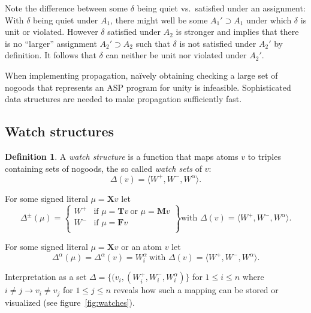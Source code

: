 \documentclass{vutinfth} %
\theoremstyle{example}
\theoremstyle{definition}
\newtheorem{definition}{Definition}[section]
\theoremstyle{theorem}
\theoremstyle{lemma}
\theoremstyle{corollary}
\newcommand{\ass}{A}
\newcommand{\bT}{\mathbf{T}}
\newcommand{\bM}{\mathbf{M}}
\newcommand{\bF}{\mathbf{F}}
\newcommand{\bX}{\mathbf{X}}
\newcommand{\upinv}{quiet\xspace}
\newcommand{\sgl}{\mu}
\begin{document}
Note the difference between some $\delta$ being \upinv vs.~satisfied under an assignment: With $\delta$ being \upinv under $\ass_1$, there might well be some $\ass_1' \supset \ass_1$ under which $\delta$ is unit or violated. However $\delta$ satisfied under $\ass_2$ is stronger and implies that there is no \enquote{larger} assignment $\ass_2' \supset \ass_2$ such that $\delta$ is not satisfied under $\ass_2'$ by definition. It follows that $\delta$ can neither be unit nor violated under $\ass_2'$.

When implementing propagation, na{\"i}vely obtaining checking a large set of nogoods that represents an ASP program for unity is infeasible. Sophisticated data structures are needed to make propagation sufficiently fast.

\subsection{Watch structures}

\begin{definition}
A \emph{watch structure} is a function that maps atoms $v$ to triples containing sets of nogoods, the so called \emph{watch sets} of $v$: $$\Delta(v) = \langle W^+, W^-, W^\alpha \rangle .$$


For some signed literal $\sgl = \bX v$ let $$\Delta^\pm(\sgl) = \left\{\begin{array}{ll}
        W^+ & \text{if } \sgl = \bT v \ \text{or } \sgl = \bM v\\
        W^- & \text{if } \sgl = \bF v \\
        \end{array}\right\} \text{with } \Delta(v) = \langle W^+, W^-, W^\alpha \rangle .$$

For some signed literal $\sgl = \bX v$ or an atom $v$ let $$\Delta^\alpha(\sgl) = \Delta^\alpha(v) = W_i^\alpha \ \text{with } \Delta(v) = \langle W^+, W^-, W^\alpha \rangle .$$
\end{definition}

Interpretation as a set $\Delta = \{(v_i, (W_i^+, W_i^-, W_i^\alpha)\}$ for $1 \leq i \leq n$ where $i \not = j \to v_i \not = v_j$ for $1 \leq j \leq n$ reveals how such a mapping can be stored or visualized (see figure~\ref{fig:watches}).
\end{document}
